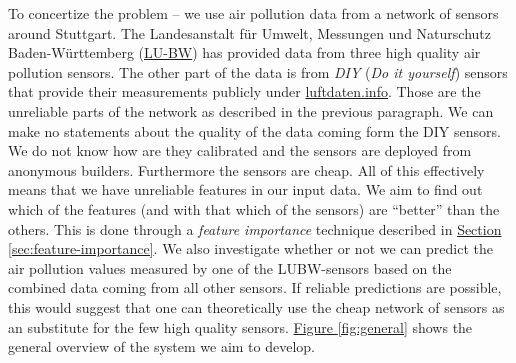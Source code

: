 \documentclass[12pt,a4paper,twoside]{scrartcl}
\numberwithin{equation}{section}
\newcommand{\reffig}[1]{\hyperref[#1]{Figure \ref*{#1}}}
\newcommand{\refsec}[1]{\hyperref[#1]{Section \ref*{#1}}}
\begin{document}
To concertize the problem -- we use air pollution data from a network of sensors around Stuttgart. The Landesanstalt für Umwelt, Messungen und Naturschutz Baden-Württemberg (\href{https://www.lubw.baden-wuerttemberg.de/startseite}{LU-BW}) has provided data from three high quality air pollution sensors. The other part of the data is from \emph{DIY} (\emph{Do it yourself}) sensors that provide their measurements publicly under \href{https://luftdaten.info/}{luftdaten.info}. Those are the unreliable parts of the network as described in the previous paragraph. We can make no statements about the quality of the data coming form the DIY sensors. We do not know how are they calibrated and the sensors are deployed from anonymous builders. Furthermore the sensors are cheap. All of this effectively means that we have unreliable features in our input data. We aim to find out which of the features (and with that which of the sensors) are ``better'' than the others. This is done through a \emph{feature importance} technique described in \refsec{sec:feature-importance}. We also investigate whether or not we can predict the air pollution values measured by one of the LUBW-sensors based on the combined data coming from all other sensors. If reliable predictions are possible, this would suggest that one can theoretically use the cheap network of sensors as an substitute for the few high quality sensors. \reffig{fig:general} shows the general overview of the system we aim to develop.
\vfill
\end{document}
